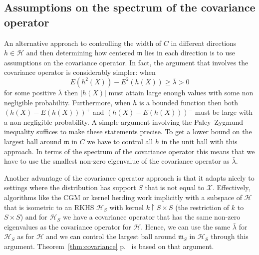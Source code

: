 \documentclass[AHL,Unicode,longabstracts,published]{cedram}
\theoremstyle{remark}
\newcommand{\restrr}
{\!\!\upharpoonright\!\!}
\newcommand{\X}{\mathcal{X}}
\newcommand{\cH}{\mathcal{H}}
\newcommand{\mean}{\mathfrak{m}}
\begin{document}
\subsection{Assumptions on the spectrum of the covariance operator}

An alternative approach to controlling the width of $C$ in different directions $h \in \cH$ and then determining how centered $\mean$ lies in each direction is to use assumptions on the covariance operator. In fact, the argument that involves the covariance operator is considerably simpler: when
\[
E(h^2(X)) - E^2(h(X)) \geq \bar \lambda > 0
\]
for some positive $\bar \lambda$ then $|h(X)|$ must attain large enough values with some non negligible probability. Furthermore, when $h$ is a bounded function then both $(h(X) - E(h(X)))^+$ and $(h(X)-E(h(X)))^-$ must be large with a non-negligible probability. A simple argument involving the Paley--Zygmund inequality suffices to make these statements precise. To get a lower bound on the largest ball around $\mean$ in $C$ we have to control all $h$ in the unit ball with this approach. In terms of the spectrum of the covariance operator this means that we have to use the smallest non-zero eigenvalue of the covariance operator as $\bar \lambda$.

Another advantage of the covariance operator approach is that it adapts nicely to settings where the distribution has support $S$ that is not equal to $\X$. Effectively, algorithms like the CGM or kernel herding work implicitly with a subspace of $\cH$ that is isometric to an RKHS $\cH_S$ with kernel $k\restrr S \times S$ (the restriction of $k$ to $S \times S$) and for $\cH_S$ we have a covariance operator that has the same non-zero eigenvalues as the covariance operator for $\cH$. Hence, we can use the same $\bar \lambda$ for $\cH_S$ as for $\cH$ and we can control the largest ball around $\mean_S$ in $\cH_S$ through this argument. Theorem~\ref{thm:covariance} p.~\pageref{thm:covariance} is based on that argument.
\end{document}

